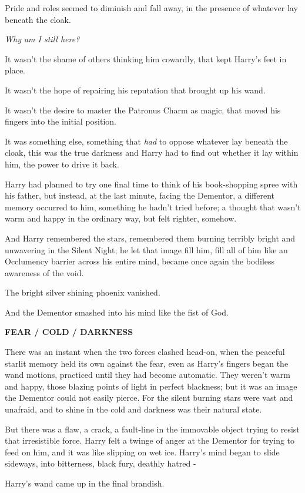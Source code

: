 Pride and roles seemed to diminish and fall away, in the presence of
whatever lay beneath the cloak.

\emph{Why am I still here?}

It wasn't the shame of others thinking him cowardly, that kept Harry's
feet in place.

It wasn't the hope of repairing his reputation that brought up his wand.

It wasn't the desire to master the Patronus Charm as magic, that moved
his fingers into the initial position.

It was something else, something that \emph{had} to oppose whatever lay
beneath the cloak, this was the true darkness and Harry had to find out
whether it lay within him, the power to drive it back.

Harry had planned to try one final time to think of his book-shopping
spree with his father, but instead, at the last minute, facing the
Dementor, a different memory occurred to him, something he hadn't tried
before; a thought that wasn't warm and happy in the ordinary way, but
felt righter, somehow.

And Harry remembered the stars, remembered them burning terribly bright
and unwavering in the Silent Night; he let that image fill him, fill all
of him like an Occlumency barrier across his entire mind, became once
again the bodiless awareness of the void.

The bright silver shining phoenix vanished.

And the Dementor smashed into his mind like the fist of God.

\textbf{FEAR / COLD / DARKNESS}

There was an instant when the two forces clashed head-on, when the
peaceful starlit memory held its own against the fear, even as Harry's
fingers began the wand motions, practiced until they had become
automatic. They weren't warm and happy, those blazing points of light in
perfect blackness; but it was an image the Dementor could not easily
pierce. For the silent burning stars were vast and unafraid, and to
shine in the cold and darkness was their natural state.

But there was a flaw, a crack, a fault-line in the immovable object
trying to resist that irresistible force. Harry felt a twinge of anger
at the Dementor for trying to feed on him, and it was like slipping on
wet ice. Harry's mind began to slide sideways, into bitterness, black
fury, deathly hatred -

Harry's wand came up in the final brandish.

